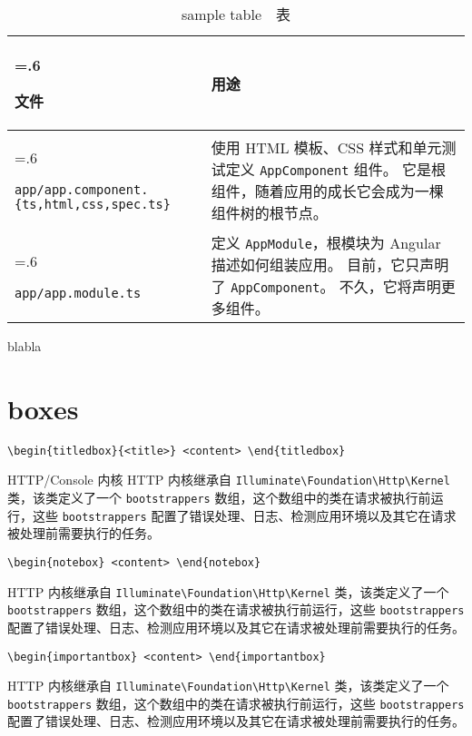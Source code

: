 \documentclass{progartcn}
\begin{document}
\noindent
\begin{table}[h!]
  \caption{sample table　表 }\label{table:1}
  \begin{tabularx}{\textwidth}{>{\hsize=.6\hsize\raggedright\arraybackslash}X>{\raggedright\arraybackslash}X}\toprule
    \bfseries{文件} & \bfseries{用途}\\ \midrule
    \verb|app/app.component.{ts,html,css,spec.ts}| & 使用 HTML 模板、CSS 样式和单元测试定义 \verb|AppComponent| 组件。 它是根组件，随着应用的成长它会成为一棵组件树的根节点。\\
    \verb|app/app.module.ts| & 定义 \verb|AppModule|，根模块为 Angular 描述如何组装应用。 目前，它只声明了 \verb|AppComponent|。 不久，它将声明更多组件。\\ \bottomrule
  \end{tabularx}
\end{table}
blabla

\clearpage

\section{boxes}

\noindent\verb|\begin{titledbox}{<title>} <content> \end{titledbox}|

\begin{titledbox}{HTTP/Console 内核}
  HTTP 内核继承自 \verb|Illuminate\Foundation\Http\Kernel| 类，该类定义了一个 \verb|bootstrappers| 数组，这个数组中的类在请求被执行前运行，这些 \verb|bootstrappers| 配置了错误处理、日志、检测应用环境以及其它在请求被处理前需要执行的任务。
\end{titledbox}

\noindent\verb|\begin{notebox} <content> \end{notebox}|

\begin{notebox}
  HTTP 内核继承自 \verb|Illuminate\Foundation\Http\Kernel| 类，该类定义了一个 \verb|bootstrappers| 数组，这个数组中的类在请求被执行前运行，这些 \verb|bootstrappers| 配置了错误处理、日志、检测应用环境以及其它在请求被处理前需要执行的任务。
\end{notebox}

\noindent\verb|\begin{importantbox} <content> \end{importantbox}|

\begin{importantbox}
  HTTP 内核继承自 \verb|Illuminate\Foundation\Http\Kernel| 类，该类定义了一个 \verb|bootstrappers| 数组，这个数组中的类在请求被执行前运行，这些 \verb|bootstrappers| 配置了错误处理、日志、检测应用环境以及其它在请求被处理前需要执行的任务。
\end{importantbox}
\end{document}

